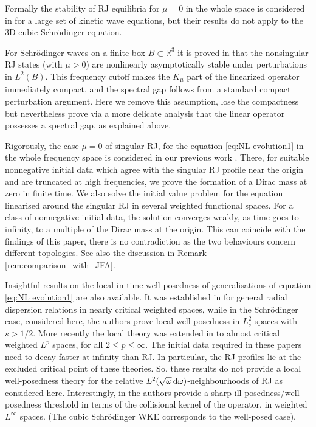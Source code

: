 \documentclass[reqno,11pt,letterpaper]{amsart}
\numberwithin{equation}{section}
\newcommand{\dd}{\, {\rm d}}
\newcommand{\R}{\mathbb{R}}
\begin{document}
Formally the stability of RJ equilibria for $\mu =0$ in the whole space is considered in \cite{ZakLvovFalkov} for a large set of kinetic wave equations, but their results do not apply to the 3D cubic Schr\"odinger equation.

For Schr\"odinger waves on a finite box $B \subset \R^3$ it is proved in \cite{Men23} that the nonsingular RJ states (with $\mu >0$) are nonlinearly asymptotically stable under perturbations in $L^2(B)$. 
This frequency cutoff makes the $K_\mu$ part of the linearized operator immediately compact, and the spectral gap follows from a standard compact perturbation argument. Here we remove this assumption, lose the compactness but nevertheless prove via a more delicate analysis that the linear operator possesses a spectral gap, as explained above.

Rigorously, the case $\mu=0$ of singular RJ, for the equation \eqref{eq:NL evolution1} in the whole frequency space is considered in our previous work \cite{EscMenegaki26}. 
There, for suitable nonnegative initial data which agree with the singular RJ profile near the origin and are truncated at high frequencies, we prove the formation of a Dirac mass at zero in finite time. We also solve the initial value problem for the equation linearised around the singular RJ in several weighted 
functional spaces. For a class of nonnegative initial data, the solution converges weakly, as time goes to infinity, to a multiple of the Dirac mass at the origin. 
This can coincide with the findings of this paper, there  is no contradiction as the two behaviours concern different topologies. See also the discussion in Remark \ref{rem:comparison_with_JFA}.  

Insightful results on the local in time well-posedness of generalisations of equation \eqref{eq:NL evolution1} are also available.  
It was established in \cite{GIT20} for general radial dispersion relations in nearly critical weighted spaces, while in the Schr\"{o}dinger case, considered here, the authors prove local well-posedness in $L^2_s$ spaces with $s>1/2$. More recently the local theory was extended in \cite{IoakeimLeger26} to almost critical weighted $L^p$ spaces, for all $2\leq p\leq \infty$.
The initial data required in these papers need to decay faster at infinity than RJ. In particular, the RJ profiles lie at the excluded critical point of
these theories. So, these results do not provide a local well-posedness theory for the relative
$L^2(\sqrt{\omega}\dd\omega)$-neighbourhoods of RJ as  considered here.
 Interestingly, in \cite{Ampatzoglou_ill_posed} the authors provide a sharp ill-posedness/well-posedness threshold in terms of the collisional kernel of the operator, in weighted $L^\infty$ spaces. (The cubic
Schr\"{o}dinger WKE corresponds to the well-posed case).
 
\end{document}
